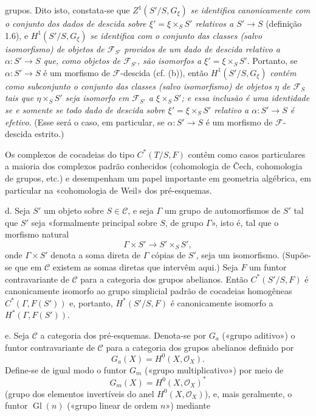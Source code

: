 grupos. Dito isto, constata-se que $Z^1(S'/S,G_\xi)$ \emph{se identifica
canonicamente com o conjunto dos dados de descida sobre
$\xi'=\xi\times_SS'$ relativos a $S'\longrightarrow S$} (definição 1.6), e
$H^1(S'/S,G_\xi)$ \emph{se identifica com o conjunto das classes (salvo
isomorfismo) de objetos de $\mathcal F_{S'}$ providos de um dado de descida
relativo a $\alpha:S'\longrightarrow S$ que, como objetos de
$\mathcal F_{S'}$, são isomorfos a $\xi'=\xi\times_SS'$}. Portanto, se
$\alpha:S'\longrightarrow S$ é um morfismo de $\mathcal F$-descida
(cf. (b)), então $H^1(S'/S,G_\xi)$ \emph{contém como subconjunto o
conjunto das classes (salvo isomorfismo) de objetos $\eta$ de
$\mathcal F_S$ tais que $\eta\times_SS'$ seja isomorfo em
$\mathcal F_{S'}$ a $\xi\times_SS'$; e essa inclusão é uma identidade se e
somente se todo dado de descida sobre $\xi'=\xi\times_SS'$ relativo a
$\alpha:S'\longrightarrow S$ é efetivo}. (Esse será o caso, em particular,
se $\alpha:S'\longrightarrow S$ é um morfismo de $\mathcal F$-descida
estrito.)

 Os complexos de cocadeias do tipo $C^*(T/S,F)$
contêm como casos particulares a maioria dos complexos padrão
conhecidos (cohomologia de Čech, cohomologia de grupos, etc.) e desempenham um
papel importante em geometria algébrica, em particular na «cohomologia de
Weil» dos pré-esquemas.

\medskip\noindent
d.  Seja $S'$ um objeto sobre $S\in\mathcal C$, e seja
$\Gamma$ um grupo de automorfismos de $S'$ tal que $S'$ seja «formalmente
principal sobre $S$, de grupo $\Gamma$», isto é, tal que o morfismo natural
\[
  \Gamma\times S'\longrightarrow S'\times_SS',
\]
onde $\Gamma\times S'$ denota a soma direta de $\Gamma$ cópias de $S'$, seja
um isomorfismo. (Supõe-se que em $\mathcal C$ existem as somas diretas que
intervêm aqui.) Seja $F$ um funtor contravariante de $\mathcal C$ para a
categoria dos grupos abelianos. Então $C^*(S'/S,F)$ é canonicamente
isomorfo ao grupo simplicial padrão de cocadeias homogêneas
$C^*(\Gamma,F(S'))$ e, portanto, $H^*(S'/S,F)$ é canonicamente isomorfo a
$H^*(\Gamma,F(S'))$.

\medskip\noindent
e.  Seja $\mathcal C$ a categoria dos pré-esquemas. Denota-se
por $G_a$ («grupo aditivo») o funtor contravariante de $\mathcal C$ para a
categoria dos grupos abelianos definido por
\[
  G_a(X)=H^0(X,\mathcal O_X).
\]
Define-se de igual modo o funtor $G_m$ («grupo multiplicativo») por meio de
\[
  G_m(X)=H^0(X,\mathcal O_X)^*
\]
(grupo dos elementos invertíveis do anel $H^0(X,\mathcal O_X)$), e, mais
geralmente, o funtor $\operatorname{Gl}(n)$ («grupo linear de ordem $n$»)
mediante

